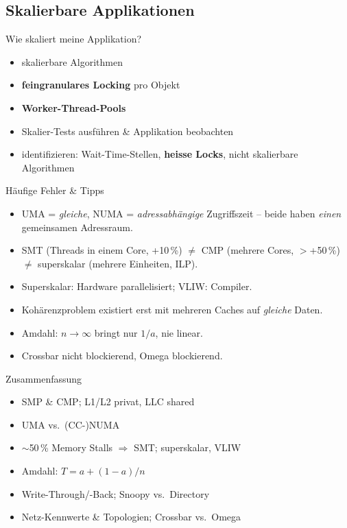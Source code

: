 \documentclass[a4paper, fontsize=7pt]{scrartcl}
\begin{document}
\subsection{Skalierbare Applikationen}

\begin{mainbox}{Wie skaliert meine Applikation?}
\begin{itemize}
    \item skalierbare Algorithmen
    \item \textbf{feingranulares Locking} pro Objekt
    \item \textbf{Worker-Thread-Pools}
    \item Skalier-Tests ausführen \& Applikation beobachten
    \item identifizieren: Wait-Time-Stellen, \textbf{heisse Locks},
          nicht skalierbare Algorithmen
\end{itemize}
\end{mainbox}

\begin{subbox}{Häufige Fehler \& Tipps}
\begin{itemize}
    \item UMA = \emph{gleiche}, NUMA = \emph{adressabhängige} Zugriffszeit --
          beide haben \emph{einen} gemeinsamen Adressraum.
    \item SMT (Threads in einem Core, +10\,\%) $\neq$ CMP (mehrere Cores,
          $>$+50\,\%) $\neq$ superskalar (mehrere Einheiten, ILP).
    \item Superskalar: Hardware parallelisiert; VLIW: Compiler.
    \item Kohärenzproblem existiert erst mit mehreren Caches auf
          \emph{gleiche} Daten.
    \item Amdahl: $n \to \infty$ bringt nur $1/a$, nie linear.
    \item Crossbar nicht blockierend, Omega blockierend.
\end{itemize}
\end{subbox}

\begin{subbox}{Zusammenfassung}
\begin{itemize}
    \item SMP \& CMP; L1/L2 privat, LLC shared
    \item UMA vs.\ (CC-)NUMA
    \item $\sim$50\,\% Memory Stalls $\Rightarrow$ SMT; superskalar, VLIW
    \item Amdahl: $T = a + (1-a)/n$
    \item Write-Through/-Back; Snoopy vs.\ Directory
    \item Netz-Kennwerte \& Topologien; Crossbar vs.\ Omega
\end{itemize}
\end{subbox}
\end{document}
